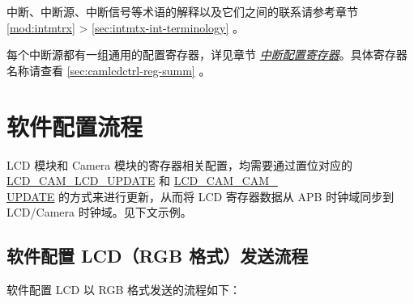 \documentclass[main\_\_CN.tex]{subfiles}
\begin{document}
\begin{tiplisting}
中断、中断源、中断信号等术语的解释以及它们之间的联系请参考章节 \ref{mod:intmtrx} \textit{} > \ref{sec:intmtx-int-terminology} \textit{}。
\end{tiplisting}

每个中断源都有一组通用的配置寄存器，详见章节 \hyperref[interrupt-config-registers]{\textit{中断配置寄存器}}。具体寄存器名称请查看 \ref{sec:camlcdctrl-reg-summ} \textit{}。

\section{软件配置流程}

\begin{tiplisting}
LCD 模块和 Camera 模块的寄存器相关配置，均需要通过置位对应的 \hyperref[fielddesc:LCDCAMLCDUPDATE]{LCD\_CAM\_LCD\_UPDATE} 和 \hyperref[fielddesc:LCDCAMCAMUPDATE]{LCD\_CAM\_CAM\_\\UPDATE} 的方式来进行更新，从而将 LCD 寄存器数据从 APB 时钟域同步到 LCD/Camera 时钟域。见下文示例。
\end{tiplisting}
\vspace{-2em}
\subsection{软件配置 LCD（RGB 格式）发送流程}
软件配置 LCD 以 RGB 格式发送的流程如下：
\end{document}
